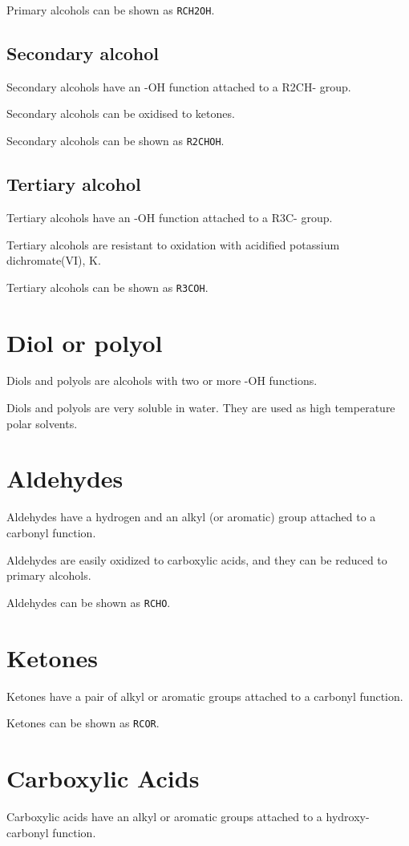 \documentclass[oneside]{book} %
\theoremstyle{plain}
\begin{document}
Primary alcohols can be shown as \texttt{RCH2OH}.

\subsection{Secondary alcohol}
Secondary alcohols have an -OH function attached to a R2CH- group.

Secondary alcohols can be oxidised to ketones.

Secondary alcohols can be shown as \texttt{R2CHOH}.

\subsection{Tertiary alcohol}
Tertiary alcohols have an -OH function attached to a R3C- group.

Tertiary alcohols are resistant to oxidation with acidified potassium
dichromate(VI), K.

Tertiary alcohols can be shown as \texttt{R3COH}.

\section{Diol or polyol}
Diols and polyols are alcohols with two or more -OH functions.

Diols and polyols are very soluble in water. They are used as high temperature
polar solvents.

\section{Aldehydes}
Aldehydes have a hydrogen and an alkyl (or aromatic) group attached to a
carbonyl function.

Aldehydes are easily oxidized to carboxylic acids, and they can be reduced to
primary alcohols.

Aldehydes can be shown as \texttt{RCHO}.

\section{Ketones}
Ketones have a pair of alkyl or aromatic groups attached to a carbonyl function.

Ketones can be shown as \texttt{RCOR}.

\section{Carboxylic Acids}
Carboxylic acids have an alkyl or aromatic groups attached to a hydroxy-carbonyl
function.
\end{document}
